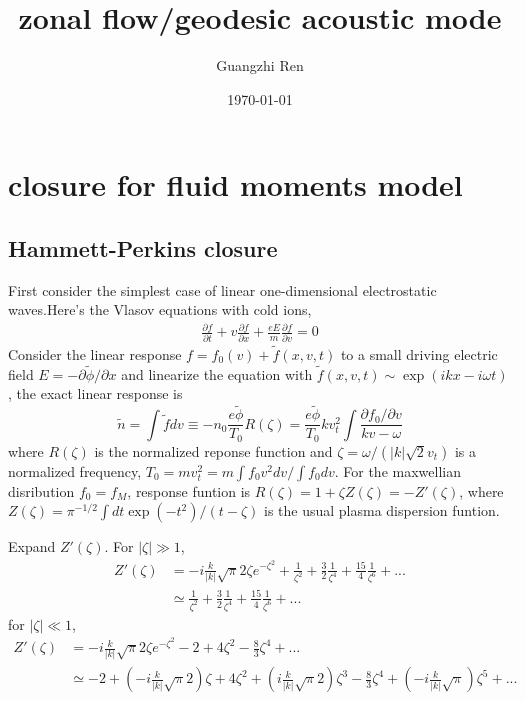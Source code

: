 \documentclass[11pt,a4paper]{article}
\title{zonal flow/geodesic acoustic mode}
\author{Guangzhi Ren}
\date{\today}
\begin{document}
	
	\maketitle


\section{closure for fluid moments model}
\subsection{Hammett-Perkins closure}
First consider the simplest case of linear one-dimensional electrostatic waves.Here's the Vlasov equations with cold ions,
	\begin{equation}
	\begin{aligned}
		\frac{\partial{f}}{\partial{t}}
		+v\frac{\partial{f}}{\partial{x}}
		+\frac{eE}{m}\frac{\partial{f}}{\partial{v}}=0
	\end{aligned}
	\end{equation}	
Consider the linear response $f=f_0(v)+\tilde{f}(x,v,t)$ to a small driving electric field $E=-\partial\tilde{\phi}/\partial{x}$ and linearize the equation with $\tilde{f}(x,v,t)\sim\exp(ikx-i\omega{t})$, the exact linear response is
	\begin{equation}
		\tilde{n}=\int\tilde{f}dv \equiv -n_0\frac{e\tilde{\phi}}{T_0}R(\zeta)
		=\frac{e\tilde{\phi}}{T_0}kv_t^2\int\frac{\partial{f_0}/\partial{v}}{kv-\omega}
	\end{equation}	
where $R(\zeta)$ is the normalized reponse function and $\zeta=\omega/(|k|\sqrt{2}v_t)$	is a normalized frequency, $T_0=mv_t^2=m\int{f_0}v^2dv/\int{f_0}dv$. For the maxwellian disribution $f_0=f_M$, response funtion is $R(\zeta)=1+\zeta{Z(\zeta)}=-Z'(\zeta)$, where $Z(\zeta)=\pi^{-1/2}\int{dt}\exp(-t^2)/(t-\zeta)$ is the usual plasma dispersion funtion.

	Expand $Z'(\zeta)$. For $|\zeta|\gg{1}$,
	\begin{equation}
	\begin{aligned}
		Z'(\zeta)&=-i\frac{k}{|k|}\sqrt{\pi}2\zeta{e^{-\zeta^2}}
		+\frac{1}{\zeta^2}+\frac{3}{2}\frac{1}{\zeta^4}+\frac{15}{4}\frac{1}{\zeta^6}+...\\
		&\simeq \frac{1}{\zeta^2}+\frac{3}{2}\frac{1}{\zeta^4}+\frac{15}{4}\frac{1}{\zeta^6}+...
	\end{aligned}
	\end{equation}
	for $|\zeta|\ll{1}$,
	\begin{equation}
	\begin{aligned}
		Z'(\zeta)&=-i\frac{k}{|k|}\sqrt{\pi}2\zeta{e^{-\zeta^2}}-2+4\zeta^2-\frac{8}{3}\zeta^4+...\\
		&\simeq -2+(-i\frac{k}{|k|}\sqrt{\pi}2)\zeta+4\zeta^2
		+(i\frac{k}{|k|}\sqrt{\pi}2)\zeta^3-\frac{8}{3}\zeta^4+(-i\frac{k}{|k|}\sqrt{\pi})\zeta^5+...
	\end{aligned}
	\end{equation}
\end{document}
